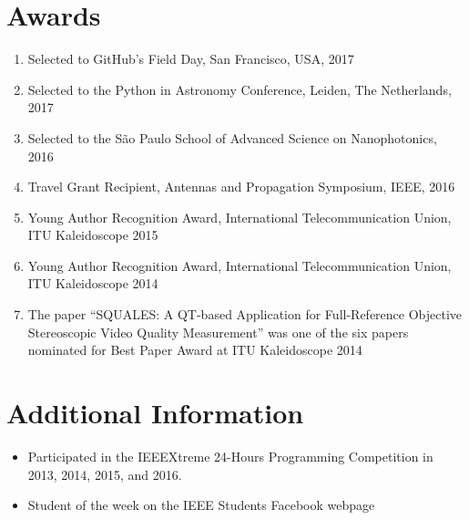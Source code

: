\documentclass[10pt]{article}
\begin{document}
\begin{titlepage}
\section{Awards}
\begin{enumerate}
  \item Selected to GitHub's Field Day, San Francisco, USA, 2017
  \item Selected to the Python in Astronomy Conference, Leiden, The Netherlands, 2017
  \item Selected to the S\~ao Paulo School of Advanced Science on Nanophotonics, 2016
  \item Travel Grant Recipient, Antennas and Propagation Symposium, IEEE, 2016
  \item Young Author Recognition Award, International Telecommunication Union, ITU Kaleidoscope 2015
  \item Young Author Recognition Award, International Telecommunication Union, ITU Kaleidoscope 2014
  \item The paper ``SQUALES: A QT-based Application for Full-Reference Objective Stereoscopic Video Quality Measurement'' was one of the six papers nominated for Best Paper Award at ITU Kaleidoscope 2014
\end{enumerate}

\section{Additional Information}
\begin{itemize}
\item Participated in the IEEEXtreme 24-Hours Programming Competition in 2013, 2014, 2015, and 2016.
\item Student of the week on the IEEE Students Facebook webpage
\end{itemize}

\end{titlepage}
\end{document}
